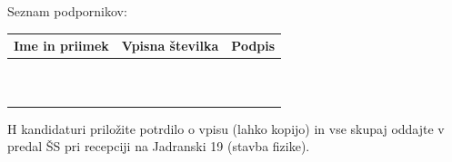 \documentclass[a4paper,oneside,12pt]{article}
\begin{document}
Seznam podpornikov:

\renewcommand{\arraystretch}{1.4}
\begin{tabularx}{\textwidth}{|XX|X|X|} \hline
 \multicolumn{2}{|l|}{\textbf{Ime in priimek}} & \textbf{Vpisna številka} & \textbf{Podpis} \\ \hline
  & & & \\ \hline
  & & & \\ \hline
  & & & \\ \hline
  & & & \\ \hline
  & & & \\ \hline
  & & & \\ \hline
  & & & \\ \hline
  & & & \\ \hline
  & & & \\ \hline
  & & & \\ \hline
\end{tabularx}

H kandidaturi priložite potrdilo o vpisu (lahko kopijo) in vse skupaj
oddajte v predal ŠS pri recepciji na Jadranski 19 (stavba fizike).
\end{document}

